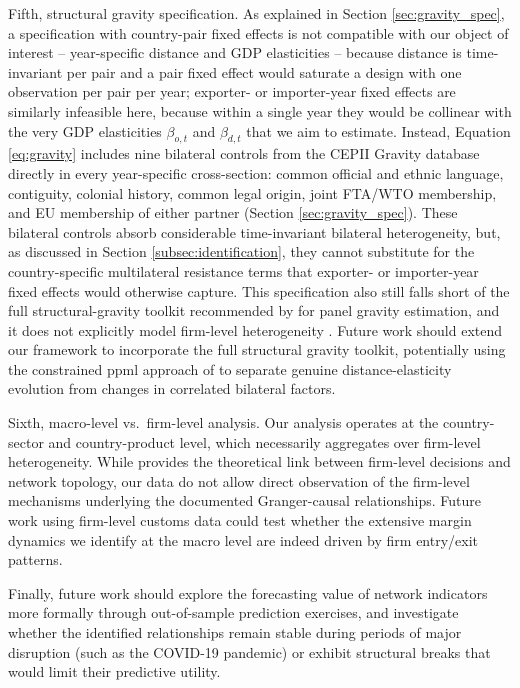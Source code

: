 \documentclass[preprint, 3p,
authoryear]{elsarticle} %
\begin{document}
Fifth, structural gravity specification. As explained in Section
\ref{sec:gravity_spec}, a specification with country-pair fixed effects
is not compatible with our object of interest -- year-specific distance
and GDP elasticities -- because distance is time-invariant per pair and
a pair fixed effect would saturate a design with one observation per
pair per year; exporter- or importer-year fixed effects are similarly
infeasible here, because within a single year they would be collinear
with the very GDP elasticities \(\beta_{o,t}\) and \(\beta_{d,t}\) that
we aim to estimate. Instead, Equation \eqref{eq:gravity} includes nine
bilateral controls from the CEPII Gravity database
\citep{conte2022cepii} directly in every year-specific cross-section:
common official and ethnic language, contiguity, colonial history,
common legal origin, joint FTA/WTO membership, and EU membership of
either partner (Section \ref{sec:gravity_spec}). These bilateral
controls absorb considerable time-invariant bilateral heterogeneity,
but, as discussed in Section \ref{subsec:identification}, they cannot
substitute for the country-specific multilateral resistance terms that
exporter- or importer-year fixed effects would otherwise capture. This
specification also still falls short of the full structural-gravity
toolkit recommended by \citet{larch2025estimating} for panel gravity
estimation, and it does not explicitly model firm-level heterogeneity
\citep{helpman2008, melitz2015new}. Future work should extend our
framework to incorporate the full structural gravity toolkit,
potentially using the constrained \gls{ppml} approach of
\citet{larch2025estimating} to separate genuine distance-elasticity
evolution from changes in correlated bilateral factors.

Sixth, macro-level vs.~firm-level analysis. Our analysis operates at the
country-sector and country-product level, which necessarily aggregates
over firm-level heterogeneity. While \citet{chaney2014} provides the
theoretical link between firm-level decisions and network topology, our
data do not allow direct observation of the firm-level mechanisms
underlying the documented Granger-causal relationships. Future work
using firm-level customs data could test whether the extensive margin
dynamics we identify at the macro level are indeed driven by firm
entry/exit patterns.

Finally, future work should explore the forecasting value of network
indicators more formally through out-of-sample prediction exercises, and
investigate whether the identified relationships remain stable during
periods of major disruption (such as the COVID-19 pandemic) or exhibit
structural breaks that would limit their predictive utility.
\end{document}
